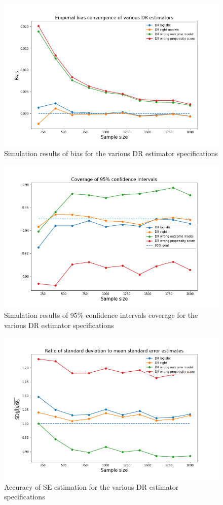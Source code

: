\documentclass[12pt,twoside]{article}
\begin{document}
\begin{figure}[h!]
    \centering
    \includegraphics[width = 0.8\columnwidth]{figures/biaspara.png}
    \caption{Simulation results of bias for the various DR estimator specifications}
    \label{figbiaspara}
\end{figure}
\begin{figure}[h!]
    \centering
    \includegraphics[width = 0.8\columnwidth]{figures/CIpara.png}
    \caption{Simulation results of 95\% confidence intervals coverage for the various DR estimator specifications}
    \label{figCIpara}
\end{figure}
\begin{figure}[h!]
    \centering
    \includegraphics[width = 0.8\columnwidth]{figures/SEpara.png}
    \caption{Accuracy of \citet{lunceford_davidian} SE estimation for the various DR estimator specifications}
    \label{figSEpara}
\end{figure}
\end{document}
